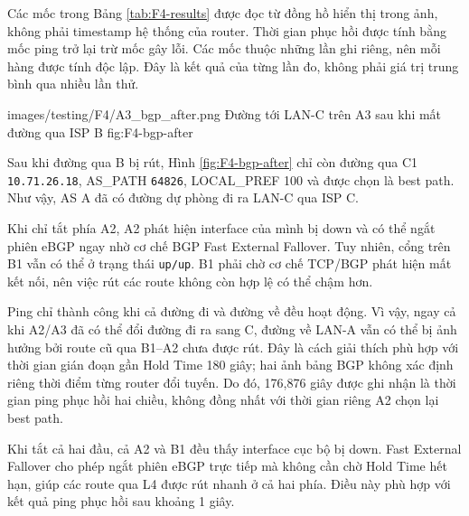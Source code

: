 Các mốc trong Bảng \ref{tab:F4-results}
được đọc từ đồng hồ hiển thị trong ảnh,
không phải timestamp hệ thống của router.
Thời gian phục hồi được tính bằng
mốc ping trở lại trừ mốc gây lỗi.
Các mốc thuộc những lần ghi riêng,
nên mỗi hàng được tính độc lập.
Đây là kết quả của từng lần đo,
không phải giá trị trung bình qua nhiều lần thử.

\partzeroimage
{images/testing/F4/A3_bgp_after.png}
{Đường tới LAN-C trên A3 sau khi mất đường qua ISP B}
{fig:F4-bgp-after}

Sau khi đường qua B bị rút,
Hình \ref{fig:F4-bgp-after} chỉ còn đường
qua C1 \texttt{10.71.26.18},
AS\_PATH \texttt{64826}, LOCAL\_PREF 100
và được chọn là best path.
Như vậy, AS A đã có đường dự phòng
đi ra LAN-C qua ISP C.

Khi chỉ tắt phía A2, A2 phát hiện
interface của mình bị down và có thể
ngắt phiên eBGP ngay nhờ cơ chế
BGP Fast External Fallover.
Tuy nhiên, cổng trên B1 vẫn có thể
ở trạng thái \texttt{up/up}.
B1 phải chờ cơ chế TCP/BGP phát hiện
mất kết nối, nên việc rút các route
không còn hợp lệ có thể chậm hơn.

Ping chỉ thành công khi cả đường đi
và đường về đều hoạt động.
Vì vậy, ngay cả khi A2/A3 đã có thể
đổi đường đi ra sang C, đường về LAN-A
vẫn có thể bị ảnh hưởng bởi route cũ
qua B1--A2 chưa được rút.
Đây là cách giải thích phù hợp với
thời gian gián đoạn gần Hold Time 180 giây;
hai ảnh bảng BGP không xác định riêng
thời điểm từng router đổi tuyến.
Do đó, 176,876 giây được ghi nhận là
thời gian ping phục hồi hai chiều,
không đồng nhất với thời gian riêng A2 chọn lại best path.

Khi tắt cả hai đầu, cả A2 và B1
đều thấy interface cục bộ bị down.
Fast External Fallover cho phép ngắt
phiên eBGP trực tiếp mà không cần chờ
Hold Time hết hạn, giúp các route
qua L4 được rút nhanh ở cả hai phía.
Điều này phù hợp với kết quả ping
phục hồi sau khoảng 1 giây.

\newpage
